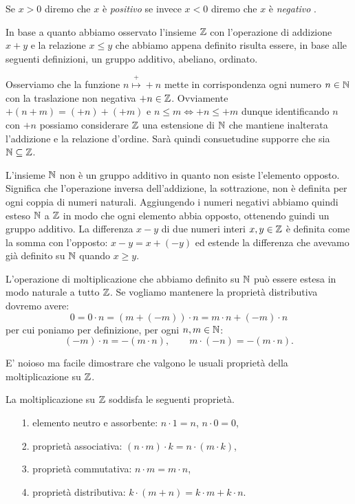 Se $x>0$ diremo che $x$ è \emph{positivo}%
%
se invece $x<0$ diremo che $x$ è \emph{negativo}%
%
.

In base a quanto abbiamo osservato l'insieme ${\mathbb Z}$ con l'operazione 
di addizione $x+y$ e la relazione $x\le y$ che abbiamo appena definito 
risulta essere, in base alle seguenti definizioni, 
un gruppo additivo, abeliano, ordinato.

  Osserviamo che la funzione $n\stackrel+\mapsto +n$ mette in corrispondenza 
  ogni numero $n\in {\mathbb N}$ con la traslazione non negativa $+n\in {\mathbb Z}$.
  Ovviamente $+(n+m) = (+n)+(+m)$ e $n\le m \iff +n \le +m$
  dunque identificando $n$ con $+n$ possiamo considerare ${\mathbb Z}$ una
  estensione di ${\mathbb N}$ che mantiene inalterata l'addizione e la relazione d'ordine.
  Sarà quindi consuetudine supporre che sia ${\mathbb N}\subseteq {\mathbb Z}$.

  L'insieme ${\mathbb N}$ non è un gruppo additivo in quanto non esiste l'elemento opposto.
  Significa che l'operazione inversa dell'addizione, la sottrazione, non è definita
  per ogni coppia di numeri naturali. 
  Aggiungendo i numeri negativi abbiamo quindi esteso ${\mathbb N}$ a ${\mathbb Z}$ in modo che 
  ogni elemento abbia opposto, ottenendo guindi un gruppo additivo.
  La differenza $x-y$ di due numeri interi $x,y\in {\mathbb Z}$ è definita come la somma 
  con l'opposto: $x-y = x + (-y)$ ed estende la differenza che avevamo già 
  definito su ${\mathbb N}$ quando $x\ge y$.

  L'operazione di moltiplicazione che abbiamo definito su ${\mathbb N}$ può essere 
  estesa in modo naturale a tutto ${\mathbb Z}$. 
  Se vogliamo mantenere la proprietà distributiva dovremo avere:
  \[
    0 = 0 \cdot n = (m+(-m))\cdot n = m\cdot n + (-m)\cdot n
  \]
  per cui poniamo per definizione, per ogni $n,m\in {\mathbb N}$:
  \[
    (-m) \cdot n = -(m\cdot n), \qquad  m \cdot (-n) = -(m\cdot n).
  \]

  E' noioso ma facile dimostrare che valgono le usuali proprietà della
  moltiplicazione su ${\mathbb Z}$.

  \begin{theorem}
    La moltiplicazione su ${\mathbb Z}$ soddisfa le seguenti proprietà.
    \begin{enumerate}
      \item[1.] elemento neutro e assorbente: $n\cdot 1 = n$, $n\cdot 0 = 0$,
      \item[2.] proprietà associativa: $(n\cdot m)\cdot k = n \cdot (m\cdot k)$,
      \item[3.] proprietà commutativa: $n\cdot m = m\cdot n$,
      \item[4.] proprietà distributiva: $k\cdot(m+n) = k\cdot m + k\cdot n$. 
    \end{enumerate}
  \end{theorem}

